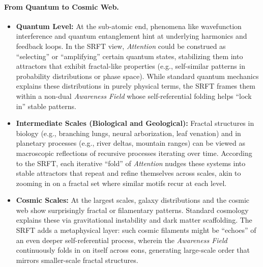 \documentclass[12pt,a4paper]{article}
\begin{document}
\paragraph{From Quantum to Cosmic Web.}  
\begin{itemize}
    \item \textbf{Quantum Level:} At the sub-atomic end, phenomena like wavefunction interference and quantum entanglement hint at underlying harmonics and feedback loops. In the SRFT view, \emph{Attention} could be construed as “selecting” or “amplifying” certain quantum states, stabilizing them into attractors that exhibit fractal-like properties (e.g., self-similar patterns in probability distributions or phase space). While standard quantum mechanics explains these distributions in purely physical terms, the SRFT frames them within a non-dual \emph{Awareness Field} whose self-referential folding helps “lock in” stable patterns.
    \item \textbf{Intermediate Scales (Biological and Geological):} Fractal structures in biology (e.g., branching lungs, neural arborization, leaf venation) and in planetary processes (e.g., river deltas, mountain ranges) can be viewed as macroscopic reflections of recursive processes iterating over time. According to the SRFT, each iterative “fold” of \emph{Attention} nudges these systems into stable attractors that repeat and refine themselves across scales, akin to zooming in on a fractal set where similar motifs recur at each level.
    \item \textbf{Cosmic Scales:} At the largest scales, galaxy distributions and the cosmic web show surprisingly fractal or filamentary patterns. Standard cosmology explains these via gravitational instability and dark matter scaffolding. The SRFT adds a metaphysical layer: such cosmic filaments might be “echoes” of an even deeper self-referential process, wherein the \emph{Awareness Field} continuously folds in on itself across eons, generating large-scale order that mirrors smaller-scale fractal structures.
\end{itemize}
\end{document}
